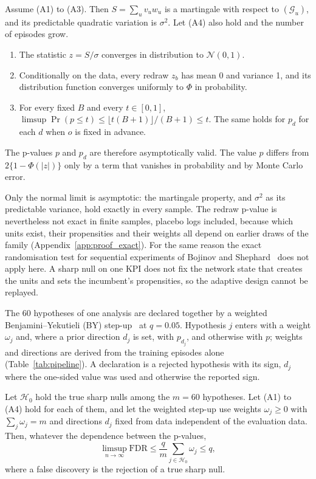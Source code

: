 \begin{proposition}
\label{prop:pmrt}
Assume (A1) to (A3). Then $S = \sum_u v_u w_u$ is a martingale with respect to $(\mathcal{G}_u)$, and its predictable
quadratic variation is $\sigma^2$. Let (A4) also hold and the number of episodes grow.
\begin{enumerate}
\item The statistic $z = S / \sigma$ converges in distribution to $\mathcal{N}(0, 1)$.
\item Conditionally on the data, every redraw $z_b$ has mean 0 and variance 1, and its distribution function converges
  uniformly to $\Phi$ in probability.
\item For every fixed $B$ and every $t \in [0, 1]$, $\limsup \Pr(p \le t) \le \lfloor t(B + 1) \rfloor / (B + 1) \le t$.
  The same holds for $p_d$ for each $d$ when $o$ is fixed in advance.
\end{enumerate}
The p-values $p$ and $p_d$ are therefore asymptotically valid. The value $p$ differs from
$2\{1 - \Phi(|z|)\}$ only by a term that vanishes in probability and by Monte Carlo error.
\end{proposition}

Only the normal limit is asymptotic: the martingale property, and $\sigma^2$ as its predictable variance, hold exactly
in every sample. The redraw p-value is nevertheless not exact in finite samples, placebo logs included, because which
units exist, their propensities and their weights all depend on earlier draws of the family
(Appendix~\ref{app:proof_exact}). For the same reason the exact randomisation test for sequential experiments of
Bojinov and Shephard~\cite{bojinov2019timeseries} does not apply here. A sharp null on one KPI does not fix the
network state that creates the units and sets the incumbent's propensities, so the adaptive design cannot be replayed.

The 60 hypotheses of one analysis are declared together by a weighted Benjamini--Yekutieli (BY)
step-up~\cite{benjamini2001dependency,blanchard2008fdr} at $q = 0.05$. Hypothesis $j$ enters with a weight $\omega_j$
and, where a prior direction $d_j$ is set, with $p_{d_j}$, and otherwise with $p$; weights and directions are derived
from the training episodes alone~\cite{roeder2009weighted} (Table~\ref{tab:pipeline}). A declaration is a rejected
hypothesis with its sign, $d_j$ where the one-sided value was used and otherwise the reported sign.

\begin{corollary}
\label{cor:fdr}
Let $\mathcal{H}_0$ hold the true sharp nulls among the $m = 60$ hypotheses. Let (A1) to (A4) hold for each of them,
and let the weighted step-up use weights $\omega_j \ge 0$ with $\sum_j \omega_j = m$ and directions $d_j$ fixed from
data independent of the evaluation data. Then, whatever the dependence between the p-values,
\begin{equation}
\limsup_{n \to \infty} \mathrm{FDR} \le \frac{q}{m} \sum_{j \in \mathcal{H}_0} \omega_j \le q,
\label{eq:fdr}
\end{equation}
where a false discovery is the rejection of a true sharp null.
\end{corollary}

